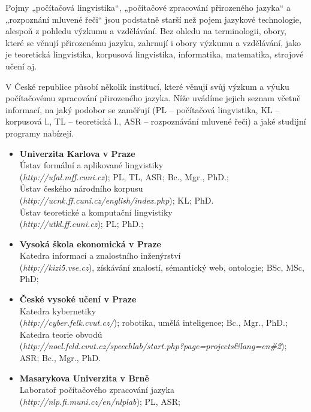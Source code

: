 \begin{multicols}{2}
Pojmy „počítačová lingvistika“, „počítačové zpracování přirozeného jazyka“ a „rozpoznání mluvené řeči“ jsou podstatně starší než pojem jazykové technologie, alespoň z pohledu výzkumu a vzdělávání. Bez ohledu na terminologii, obory, které se věnují přirozenému jazyku, zahrnují i obory výzkumu a vzdělávání, jako je teoretická lingvistika, korpusová lingvistika, informatika, matematika, strojové učení aj.

V České republice působí několik institucí, které věnují svůj výzkum a výuku počítačovému zpracování přirozeného jazyka. Níže uvádíme jejich seznam včetně informací, na jaký podobor se zaměřují (PL – počítačová lingvistika, KL – korpusová l., TL – teoretická l., ASR – rozpoznávání mluvené řeči) a jaké studijní programy nabízejí.

\begin{itemize}
\item[] \textbf{Univerzita Karlova v Praze}\\
   Ústav formální a aplikované lingvistiky\\ (\textit{http://ufal.mff.cuni.cz}); PL, TL, ASR; Bc., Mgr., PhD.;\\
  Ústav českého národního korpusu\\ (\textit{http://ucnk.ff.cuni.cz/english/index.php}); KL; PhD.\\
  Ústav teoretické a komputační lingvistiky \\(\textit{http://utkl.ff.cuni.cz}); PL; PhD.;
\item[] \textbf{Vysoká škola ekonomická v Praze}\\  
  Katedra informací a znalostního inženýrství \\(\textit{http://kizi5.vse.cz}), získávání znalostí, sémantický web, ontologie; BSc, MSc, PhD;
\item[] \textbf{České vysoké učení v Praze}\\
  Katedra kybernetiky \\(\textit{http://cyber.felk.cvut.cz/}); robotika, umělá inteligence; Bc., Mgr., PhD.;\\
  Katedra teorie obvodů \\(\textit{http://noel.feld.cvut.cz/speechlab/start.php?page=projects\&lang=en\#2});  ASR; Bc., Mgr., PhD.
\item[] \textbf{Masarykova Univerzita v Brně}\\
  Laboratoř počítačového zpracování jazyka\\ (\textit{http://nlp.fi.muni.cz/en/nlplab}); PL, ASR;\\ 

\end{itemize}
\end{multicols}
